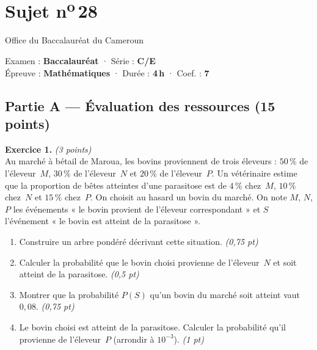 \section{Sujet n\textsuperscript{o}\,28}
\noindent\begin{minipage}{0.5\linewidth}\footnotesize Office du Baccalauréat du Cameroun\end{minipage}%
\hfill\begin{minipage}{0.45\linewidth}\footnotesize\raggedleft Examen : \textbf{Baccalauréat} · Série : \textbf{C/E}\\
Épreuve : \textbf{Mathématiques} · Durée : \textbf{4\,h} · Coef. : \textbf{7}\end{minipage}
\par\smallskip{\color{onbo}\rule{\linewidth}{1pt}}

\subsection*{Partie A — Évaluation des ressources \hfill (15 points)}

\noindent\textbf{Exercice 1.} \hfill\textit{(3 points)}\\
Au marché à bétail de Maroua, les bovins proviennent de trois éleveurs : $50\,\%$ de
l'éleveur~$M$, $30\,\%$ de l'éleveur~$N$ et $20\,\%$ de l'éleveur~$P$. Un vétérinaire
estime que la proportion de bêtes atteintes d'une parasitose est de $4\,\%$ chez~$M$,
$10\,\%$ chez~$N$ et $15\,\%$ chez~$P$. On choisit au hasard un bovin du marché. On note
$M$, $N$, $P$ les événements « le bovin provient de l'éleveur correspondant » et $S$
l'événement « le bovin est atteint de la parasitose ».
\begin{enumerate}[label=\arabic*)]
\item Construire un arbre pondéré décrivant cette situation. \hfill\textit{(0,75 pt)}
\item Calculer la probabilité que le bovin choisi provienne de l'éleveur~$N$ et soit
atteint de la parasitose. \hfill\textit{(0,5 pt)}
\item Montrer que la probabilité $P(S)$ qu'un bovin du marché soit atteint vaut $0{,}08$. \hfill\textit{(0,75 pt)}
\item Le bovin choisi est atteint de la parasitose. Calculer la probabilité qu'il
provienne de l'éleveur~$P$ (arrondir à $10^{-3}$). \hfill\textit{(1 pt)}
\end{enumerate}

